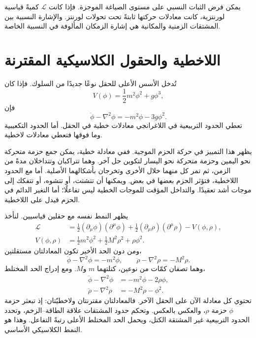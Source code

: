 يمكن فرض الثبات النسبي على مستوى الصياغة الموجزة. فإذا كانت \(\mathcal L\) كميةً قياسية لورنتزية، كانت معادلات حركتها ثابتةً تحت تحولات لورنتز. والإشارة النسبية بين المشتقات الزمنية والمكانية هي إشارة الزمكان المألوفة في النسبية الخاصة.

\section{اللاخطية والحقول الكلاسيكية المقترنة}

تُدخل الأسس الأعلى للحقل نوعًا جديدًا من السلوك. فإذا كان
\begin{equation}
V(\phi)=\frac12m^2\phi^2+g\phi^3,
\end{equation}
فإن
\begin{equation}
\ddot\phi-\nabla^2\phi=-m^2\phi-3g\phi^2.
\end{equation}
تعطي الحدود التربيعية في اللاغرانجي معادلات خطية في الحقل. أما الحدود التكعيبية وما فوقها فتعطي معادلات لاخطية.

يظهر هذا التمييز في حركة الحزم الموجية. ففي معادلة خطية، يمكن جمع حزمة متحركة نحو اليمين وحزمة متحركة نحو اليسار لتكوين حل آخر. وهما تتراكبان وتتداخلان مدةً من الزمن، ثم تمر كل منهما خلال الأخرى وتخرجان بأشكالهما الأصلية. أما مع الحدود اللاخطية، فتؤثر الحزم بعضها في بعض. ويمكنها أن تتشتت، أو تتشوه، أو تتفكك إلى موجات أشد تعقيدًا. والتداخل المؤقت للموجات الخطية ليس تفاعلًا؛ أما التغير الدائم في الحزم فيدل على اللاخطية.

يظهر النمط نفسه مع حقلين قياسيين. لنأخذ
\begin{align}
\mathcal L
&=
\frac12(\partial_\mu\phi)(\partial^\mu\phi)
+\frac12(\partial_\mu\rho)(\partial^\mu\rho)
-V(\phi,\rho),
\\
V(\phi,\rho)
&=
\frac12m^2\phi^2+\frac12M^2\rho^2+\rho\phi^2.
\end{align}
ومن دون الحد الأخير تكون المعادلتان مستقلتين،
\begin{equation}
\ddot\phi-\nabla^2\phi=-m^2\phi,
\qquad
\ddot\rho-\nabla^2\rho=-M^2\rho.
\end{equation}
وهما تصفان كمّات من نوعين، كتلتهما \(m\) و\(M\). ومع إدراج الحد المختلط،
\begin{align}
\ddot\phi-\nabla^2\phi&=-m^2\phi-2\rho\phi,
\\
\ddot\rho-\nabla^2\rho&=-M^2\rho-\phi^2.
\end{align}
تحتوي كل معادلة الآن على الحقل الآخر. فالمعادلتان مقترنتان ولاخطيّتان: إذ تبعثر حزمة \(\phi\) حزمة \(\rho\)، والعكس بالعكس. وتحكم حدود المشتقات علاقة الطاقة--الزخم، وتحدد الحدود التربيعية غير المشتقة الكتل، ويحمل الحد المختلط الأعلى رتبةً التفاعل. وهذا هو النمط الكلاسيكي الأساسي.

